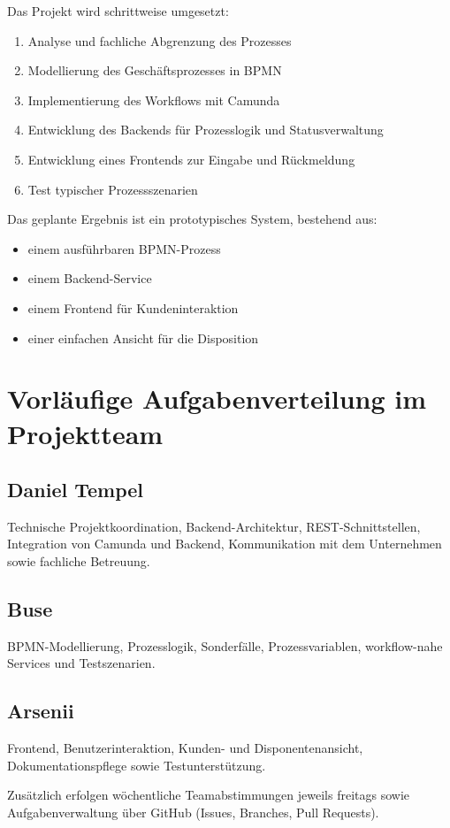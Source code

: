 \documentclass[12pt,a4paper]{article}
\begin{document}
	Das Projekt wird schrittweise umgesetzt:
	
	\begin{enumerate}[leftmargin=1.5cm]
		\item Analyse und fachliche Abgrenzung des Prozesses
		\item Modellierung des Geschäftsprozesses in BPMN
		\item Implementierung des Workflows mit Camunda
		\item Entwicklung des Backends für Prozesslogik und Statusverwaltung
		\item Entwicklung eines Frontends zur Eingabe und Rückmeldung
		\item Test typischer Prozessszenarien
	\end{enumerate}
	
	Das geplante Ergebnis ist ein prototypisches System, bestehend aus:
	
	\begin{itemize}[leftmargin=1.5cm]
		\item einem ausführbaren BPMN-Prozess
		\item einem Backend-Service
		\item einem Frontend für Kundeninteraktion
		\item einer einfachen Ansicht für die Disposition
	\end{itemize}
	
	\section{Vorläufige Aufgabenverteilung im Projektteam}
	
	\subsection*{Daniel Tempel}
	
	Technische Projektkoordination, Backend-Architektur, REST-Schnittstellen, Integration von Camunda und Backend, Kommunikation mit dem Unternehmen sowie fachliche Betreuung.
	
	\subsection*{Buse}
	
	BPMN-Modellierung, Prozesslogik, Sonderfälle, Prozessvariablen, workflow-nahe Services und Testszenarien.
	
	\subsection*{Arsenii}
	
	Frontend, Benutzerinteraktion, Kunden- und Disponentenansicht, Dokumentationspflege sowie Testunterstützung.
	
	Zusätzlich erfolgen wöchentliche Teamabstimmungen jeweils freitags sowie Aufgabenverwaltung über GitHub (Issues, Branches, Pull Requests).
	
\end{document}
